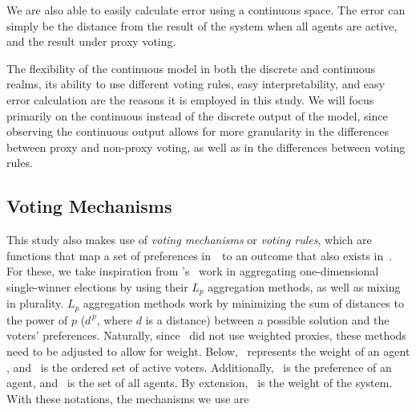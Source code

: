 We are also able to easily calculate error using a continuous space.
The error can simply be the distance from the result of the system when all agents
are active, and the result under proxy voting.

The flexibility of the continuous model in both the discrete and continuous realms, its
ability to use different voting rules, easy interpretability, and easy error
calculation are the reasons it is employed in this study.
We will focus primarily on the continuous instead of the discrete output of the
model, since observing the continuous output allows for more granularity in the
differences between proxy and non-proxy voting, as well as in the differences between
voting rules.

\subsection{Voting Mechanisms}\label{subsec:voting-mechanisms}
This study also makes use of \textit{voting mechanisms} or \textit{voting rules},
which are functions that map a set of preferences in~\systemspace\ to an outcome that
also exists in~\systemspace.
For these, we take inspiration from 's~\cite{Bulteau2021} work in
aggregating one-dimensional single-winner elections by using their $L_p$ aggregation
methods, as well as mixing in plurality.
$L_p$ aggregation methods work by minimizing the sum of distances to the power of $p$
($d^{\,p}$, where $d$ is a distance) between a possible solution and the voters'
preferences.
Naturally, since~\cite{Bulteau2021} did not use weighted proxies, these methods need
to be adjusted to allow for weight.
Below, \agentweight\ represents the weight of an agent \agent, and \systemproxies\ is
the ordered set of active voters.
Additionally, \agenttruth\ is the preference of an agent, and \system\ is the set of
all agents.
By extension, \systemweight\ is the weight of the system.
With these notations, the mechanisms we use are
